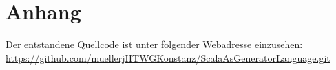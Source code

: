 \documentclass[11pt,a4paper]{report}
\begin{document}




\listoffigures
{}
\lstlistoflistings
\tableofcontents
\newpage
{}
\setcounter{page}{1}





\chapter*{Anhang}
Der entstandene Quellcode ist unter folgender Webadresse einzusehen:\\\url{https://github.com/muellerjHTWGKonstanz/ScalaAsGeneratorLanguage.git}


\nocite{*}

\end{document}
